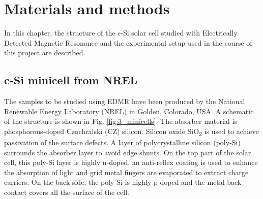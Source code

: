 \documentclass[a4paper]{book}
\newcommand{\tsub}{\textsubscript}
\begin{document}
	\chapter{Materials and methods}
	In this chapter, the structure of the c-Si solar cell studied with Electrically Detected Magnetic Resonance and the experimental setup used in the course of this project are described.
	
	\section{c-Si minicell from NREL}
	The samples to be studied using EDMR have been produced by the National Renewable Energy Laboratory (NREL) in Golden, Colorado, USA. A schematic of the structure is shown in Fig. \ref{fig:3_minicells}. The absorber material is phosphorous-doped Czochralski (CZ) silicon. Silicon oxide SiO\tsub 2 is used to achieve passivation of the surface defects. A layer of polycrystalline silicon (poly-Si) surrounds the absorber layer to avoid edge shunts. On the top part of the solar cell, this poly-Si layer is highly n-doped, an anti-reflex coating is used to enhance the absorption of light and grid metal fingers are evaporated to extract charge carriers. On the back side, the poly-Si is highly p-doped and the metal back contact covers all the surface of the cell.
\end{document}
